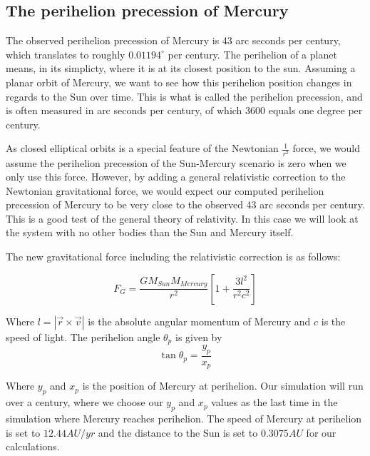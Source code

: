 \documentclass[../main.tex]{subfiles}
\begin{document}
\subsection{The perihelion precession of Mercury}
The observed perihelion precession of Mercury is 43 arc seconds per century, which translates to roughly $0.01194^\circ$ per century. The perihelion of a planet means, in its simplicty, where it is at its closest position to the sun. Assuming a planar orbit of Mercury, we want to see how this perihelion position changes in regards to the Sun over time. This is what is called the perihelion precession, and is often measured in arc seconds per century, of which $3600$ equals one degree per century.

As closed elliptical orbits is a special feature of the Newtonian $\frac{1}{r^2}$ force, we would assume the perihelion precession of the Sun-Mercury scenario is zero when we only use this force. However, by adding a general relativistic correction to the Newtonian gravitational force, we would expect our computed perihelion precession of Mercury to be very close to the observed 43 arc seconds per century. This is a good test of the general theory of relativity. In this case we will look at the system with no other bodies than the Sun and Mercury itself.

The new gravitational force including the relativistic correction is as follows:

\begin{equation}
  F_G = \frac{GM_{Sun}M_{Mercury}}{r^2} \left[ 1+\frac {3l^2}{r^2c^2} \right]
\end{equation}

 Where $l = |\vec r \times \vec v|$ is the absolute angular momentum of Mercury and $c$ is the speed of light. The perihelion angle $\theta_p$ is given by
\[\tan \theta_p = \frac{y_p}{x_p}\]

Where $y_p$ and $x_p$ is the position of Mercury at perihelion. Our simulation will run over a century, where we choose our $y_p$ and $x_p$ values as the last time in the simulation where Mercury reaches perihelion. The speed of Mercury at perihelion is set to $12.44 AU/yr$ and the distance to the Sun is set to $0.3075 AU$ for our calculations.
\end{document}

